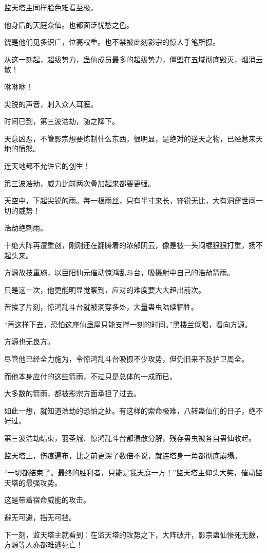 \begin{this_body}
监天塔主同样脸色难看至极。

他身后的天庭众仙。也都面泛忧愁之色。

饶是他们见多识广，位高权重。也不禁被此刻影宗的惊人手笔所摄。

从这一刻起，超级势力，蛊仙成员最多的超级势力，僵盟在五域彻底毁灭，烟消云散！

咻咻咻！

尖锐的声音，刺入众人耳膜。

时间已到，第三波浩劫，随之降下。

天意凶恶，不管影宗想要炼制什么东西，很明显，是绝对的逆天之物，已经惹来天地的愤怒。

连天地都不允许它的创生！

第三波浩劫，威力比前两次叠加起来都要更强。

天空中，下起尖锐的雨。每一根雨丝，只有半寸来长，锋锐无比，大有洞穿世间一切的威势！

浩劫绝刺雨。

十绝大阵再遭重创，刚刚还在翻腾着的浓郁阴云，像是被一头闷棍狠狠打重，扬不起头来。

方源故技重施，以巨阳仙元催动惊鸿乱斗台，吸摄射中自己的浩劫箭雨。

只是这一次，他更能明显觉察到，应对的难度要大大超出前次。

苦挨了片刻，惊鸿乱斗台就被洞穿多处，大量蛊虫陆续牺牲。

“再这样下去，恐怕这座仙蛊屋只能支撑一刻的时间。”黑楼兰低喝，看向方源。

方源也无良方。

尽管他已经全力施为，令惊鸿乱斗台吸摄不少攻势，但仍旧来不及护卫周全。

而他本身应付的这些箭雨，不过只是总体的一成而已。

大多数的箭雨，都被影宗方面承担了过去。

如此一想，就知道浩劫的恐怕之处。有这样的索命极难，八转蛊仙们的日子，绝不好过。

第三波浩劫结束，羽圣城、惊鸿乱斗台都溃散分解，残存蛊虫被各自蛊仙收起。

监天塔上，伤痕遍布，比之前更深了数倍不说，就连塔身一角都彻底崩塌。

“一切都结束了。最终的胜利者，只能是我天庭一方！”监天塔主仰头大笑，催动监天塔的最强攻势。

这是带着宿命威能的攻击。

避无可避，挡无可挡。

下一刻，监天塔主就看到：在监天塔的攻势之下，大阵破开，影宗蛊仙惨死无数，方源等人亦都难逃死亡！


\end{this_body}
